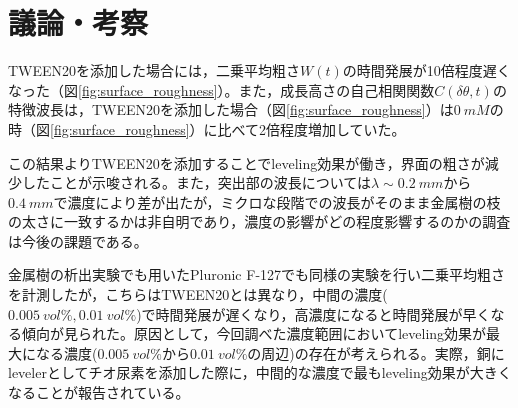 \documentclass[autodetect-engine,dvi=dvipdfmx,a4paper,ja=standard,oneside,openany,11pt,draft]{bxjsbook}
\begin{document}
\section{議論・考察}
TWEEN20を添加した場合には，二乗平均粗さ$W(t)$の時間発展が10倍程度遅くなった（図\ref{fig:surface_roughness}）。また，成長高さの自己相関関数$C(\delta\theta,t)$の特徴波長は，TWEEN20を添加した場合（図\ref{fig:surface_roughness}）は$\SI{0}{mM}$の時（図\ref{fig:surface_roughness}）に比べて2倍程度増加していた。

この結果よりTWEEN20を添加することでleveling効果が働き，界面の粗さが減少したことが示唆される。また，突出部の波長については$\lambda\sim\SI{0.2}{mm}$から$\SI{0.4}{mm}$で濃度により差が出たが，ミクロな段階での波長がそのまま金属樹の枝の太さに一致するかは非自明であり，濃度の影響がどの程度影響するのかの調査は今後の課題である。

金属樹の析出実験でも用いたPluronic F-127でも同様の実験を行い二乗平均粗さを計測したが，こちらはTWEEN20とは異なり，中間の濃度($\SI{0.005}{vol\%},\SI{0.01}{vol\%}$)で時間発展が遅くなり，高濃度になると時間発展が早くなる傾向が見られた。原因として，今回調べた濃度範囲においてleveling効果が最大になる濃度($\SI{0.005}{vol\%}$から$\SI{0.01}{vol\%}$の周辺)の存在が考えられる。実際，銅にlevelerとしてチオ尿素を添加した際に，中間的な濃度で最もleveling効果が大きくなることが報告されている\cite{schilardi2000stable}。

\ifdraft{
  
  
}{}
\end{document}
